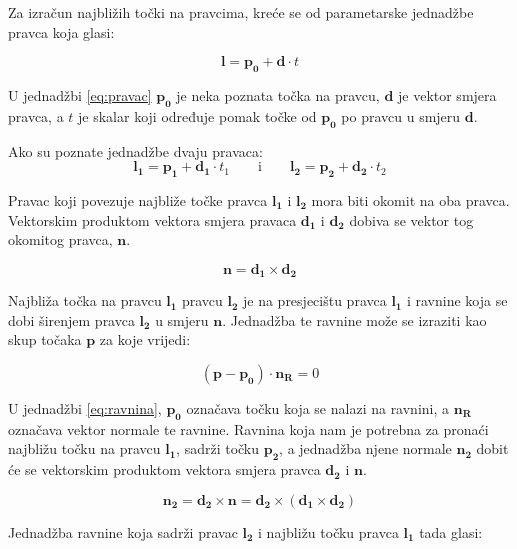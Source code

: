\documentclass[times, utf8, diplomski]{fer}
\begin{document}
Za izračun najbližih točki na pravcima, kreće se od parametarske jednadžbe pravca koja glasi:

\begin{equation}
\bm{l} = \bm{p_0} + \bm{d}\cdot t
\label{eq:pravac}
\end{equation}

\vspace{5mm}

U jednadžbi \ref{eq:pravac} $\bm{p_0}$ je neka poznata točka na pravcu, $\bm{d}$ je vektor smjera pravca, a $t$ je skalar koji određuje pomak točke od $\bm{p_0}$ po pravcu u smjeru $\bm{d}$.

Ako su poznate jednadžbe dvaju pravaca: 
\begin{equation}
\bm{l_1} = \bm{p_1} + \bm{d_1}\cdot t_1 \qquad\text{i}\qquad \bm{l_2} = \bm{p_2} + \bm{d_2}\cdot t_2
\label{eq:pravci}
\end{equation}

Pravac koji povezuje najbliže točke pravca $\bm{l_1}$ i $\bm{l_2}$ mora biti okomit na oba pravca. Vektorskim produktom vektora smjera pravaca $\bm{d_1}$ i $\bm{d_2}$ dobiva se vektor tog okomitog pravca, $\bm{n}$.

\begin{equation}
\bm{n} = \bm{d_1} \times \bm{d_2}
\end{equation}

Najbliža točka na pravcu $\bm{l_1}$ pravcu $\bm{l_2}$ je na presjecištu pravca $\bm{l_1}$ i ravnine koja se dobi širenjem pravca $\bm{l_2}$ u smjeru $\bm{n}$. Jednadžba te ravnine može se izraziti kao skup točaka $\bm{p}$ za koje vrijedi:

\begin{equation}
(\bm{p} - \bm{p_0})\cdot\bm{n_R} = 0
\label{eq:ravnina}
\end{equation}

U jednadžbi \ref{eq:ravnina}, $\bm{p_0}$ označava točku koja se nalazi na ravnini, a $\bm{n_R}$ označava vektor normale te ravnine. Ravnina koja nam je potrebna za pronaći najbližu točku na pravcu $\bm{l_1}$, sadrži točku $\bm{p_2}$, a jednadžba njene normale $\bm{n_2}$ dobit će se vektorskim produktom vektora smjera pravca $\bm{d_2}$ i $\bm{n}$.

\begin{equation}
\bm{n_2} = \bm{d_2} \times \bm{n} = \bm{d_2} \times (\bm{d_1} \times \bm{d_2})
\end{equation}

Jednadžba ravnine koja sadrži pravac $\bm{l_2}$ i najbližu točku pravca $\bm{l_1}$ tada glasi:
\end{document}
